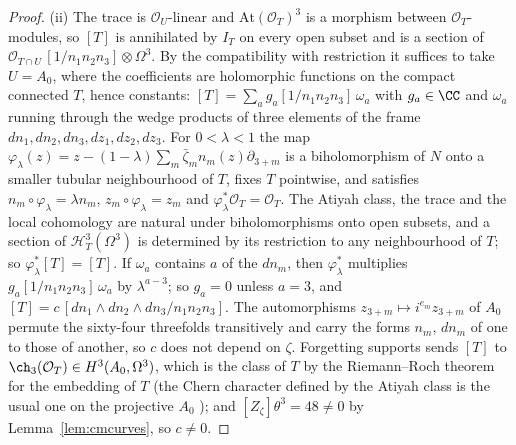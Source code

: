 \begin{proof}
(ii) The trace is $\mathcal{O}_{U}$-linear and $\mathrm{At}(\mathcal{O}_{T})^{3}$ is a morphism between $\mathcal{O}_{T}$-modules, so $[T]$ is annihilated by $I_{T}$ on every open subset and is a section of $\mathcal{O}_{T\cap U}\,[1/n_{1}n_{2}n_{3}]\otimes\Omega^{3}$. By the compatibility with restriction it suffices to take $U=A_{0}$, where the coefficients are holomorphic functions on the compact connected $T$, hence constants: $[T]=\sum_{a}g_{a}[1/n_{1}n_{2}n_{3}]\,\omega_{a}$ with $g_{a}\in\CC$ and $\omega_{a}$ running through the wedge products of three elements of the frame $dn_{1},dn_{2},dn_{3},dz_{1},dz_{2},dz_{3}$. For $0<\lambda<1$ the map $\varphi_{\lambda}(z)=z-(1-\lambda)\sum_{m}\bar\zeta_{m}n_{m}(z)\partial_{3+m}$ is a biholomorphism of $N$ onto a smaller tubular neighbourhood of $T$, fixes $T$ pointwise, and satisfies $n_{m}\circ\varphi_{\lambda}=\lambda n_{m}$, $z_{m}\circ\varphi_{\lambda}=z_{m}$ and $\varphi_{\lambda}^{*}\mathcal{O}_{T}=\mathcal{O}_{T}$. The Atiyah class, the trace and the local cohomology are natural under biholomorphisms onto open subsets, and a section of $\mathcal{H}^{3}_{T}(\Omega^{3})$ is determined by its restriction to any neighbourhood of $T$; so $\varphi_{\lambda}^{*}[T]=[T]$. If $\omega_{a}$ contains $a$ of the $dn_{m}$, then $\varphi_{\lambda}^{*}$ multiplies $g_{a}[1/n_{1}n_{2}n_{3}]\,\omega_{a}$ by $\lambda^{a-3}$; so $g_{a}=0$ unless $a=3$, and $[T]=c\,[dn_{1}\wedge dn_{2}\wedge dn_{3}/n_{1}n_{2}n_{3}]$. The automorphisms $z_{3+m}\mapsto i^{e_{m}}z_{3+m}$ of $A_{0}$ permute the sixty-four threefolds transitively and carry the forms $n_{m}$, $dn_{m}$ of one to those of another, so $c$ does not depend on $\zeta$. Forgetting supports sends $[T]$ to $\ch_{3}(\mathcal{O}_{T})\in H^{3}(A_{0},\Omega^{3})$, which is the class of $T$ by the Riemann--Roch theorem for the embedding of $T$ \cite[Ch.~15]{Ful98} (the Chern character defined by the Atiyah class is the usual one on the projective $A_{0}$ \cite{BF03}); and $[Z_{\zeta}]\theta^{3}=48\ne0$ by Lemma~\ref{lem:cmcurves}, so $c\ne0$.


\end{proof}
